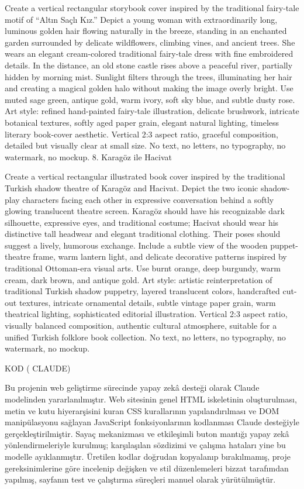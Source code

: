 \documentclass[12pt,a4paper]{article}
\begin{document}
Create a vertical rectangular storybook cover inspired by the traditional fairy-tale motif of “Altın Saçlı Kız.” Depict a young woman with extraordinarily long, luminous golden hair flowing naturally in the breeze, standing in an enchanted garden surrounded by delicate wildflowers, climbing vines, and ancient trees. She wears an elegant cream-colored traditional fairy-tale dress with fine embroidered details. In the distance, an old stone castle rises above a peaceful river, partially hidden by morning mist. Sunlight filters through the trees, illuminating her hair and creating a magical golden halo without making the image overly bright. Use muted sage green, antique gold, warm ivory, soft sky blue, and subtle dusty rose. Art style: refined hand-painted fairy-tale illustration, delicate brushwork, intricate botanical textures, softly aged paper grain, elegant natural lighting, timeless literary book-cover aesthetic. Vertical 2:3 aspect ratio, graceful composition, detailed but visually clear at small size. No text, no letters, no typography, no watermark, no mockup.
8. Karagöz ile Hacivat
 
Create a vertical rectangular illustrated book cover inspired by the traditional Turkish shadow theatre of Karagöz and Hacivat. Depict the two iconic shadow-play characters facing each other in expressive conversation behind a softly glowing translucent theatre screen. Karagöz should have his recognizable dark silhouette, expressive eyes, and traditional costume; Hacivat should wear his distinctive tall headwear and elegant traditional clothing. Their poses should suggest a lively, humorous exchange. Include a subtle view of the wooden puppet-theatre frame, warm lantern light, and delicate decorative patterns inspired by traditional Ottoman-era visual arts. Use burnt orange, deep burgundy, warm cream, dark brown, and antique gold. Art style: artistic reinterpretation of traditional Turkish shadow puppetry, layered translucent colors, handcrafted cut-out textures, intricate ornamental details, subtle vintage paper grain, warm theatrical lighting, sophisticated editorial illustration. Vertical 2:3 aspect ratio, visually balanced composition, authentic cultural atmosphere, suitable for a unified Turkish folklore book collection. No text, no letters, no typography, no watermark, no mockup.


 
KOD ( CLAUDE) 

Bu projenin web geliştirme sürecinde yapay zekâ desteği olarak Claude modelinden yararlanılmıştır. Web sitesinin genel HTML iskeletinin oluşturulması, metin ve kutu hiyerarşisini kuran CSS kurallarının yapılandırılması ve DOM manipülasyonu sağlayan JavaScript fonksiyonlarının kodlanması Claude desteğiyle gerçekleştirilmiştir. Sayaç mekanizması ve etkileşimli buton mantığı yapay zekâ yönlendirmeleriyle kurulmuş; karşılaşılan sözdizimi ve çalışma hataları yine bu modelle ayıklanmıştır. Üretilen kodlar doğrudan kopyalanıp bırakılmamış, proje gereksinimlerine göre incelenip değişken ve stil düzenlemeleri bizzat tarafımdan yapılmış, sayfanın test ve çalıştırma süreçleri manuel olarak yürütülmüştür.
\end{document}
